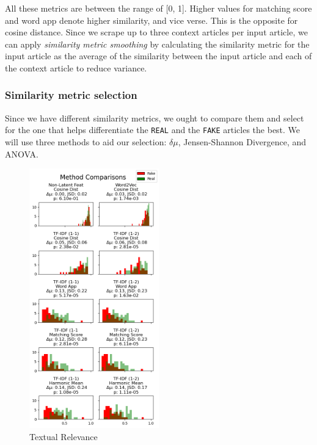 \documentclass{article}
\begin{document}
All these metrics are between the range of [0, 1]. Higher values for matching score and word app denote higher similarity, and vice verse. This is the opposite for cosine distance. Since we scrape up to three context articles per input article, we can apply \emph{similarity metric smoothing} by calculating the similarity metric for the input article as the average of the similarity between the input article and each of the context article to reduce variance.

\subsubsection{Similarity metric selection}

Since we have different similarity metrics, we ought to compare them and select for the one that helps differentiate the \texttt{REAL} and the \texttt{FAKE} articles the best. We will use three methods to aid our selection: $\delta \mu$, Jensen-Shannon Divergence, and ANOVA.

\begin{figure}
  \centering
  \includegraphics[width=0.5\textwidth]{img/textual_relevance_2.png}
  \caption{Textual Relevance}
  \label{similarity-metrics}
\end{figure}
\end{document}
